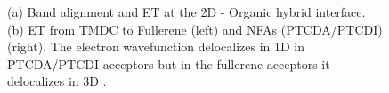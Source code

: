 \documentclass[12pt]{article}
\begin{document}
\begin{figure}[H]
\centering
{} \hspace{20pt}

\caption{(a) Band alignment and ET at the 2D - Organic hybrid interface. (b) ET from TMDC to Fullerene (left) and NFAs (PTCDA/PTCDI) (right). The electron wavefunction delocalizes in 1D in PTCDA/PTCDI acceptors but in the fullerene acceptors it delocalizes in 3D \cite{rijal2020collective}.}\label{fig:charge transfer scheme}
\end{figure}
\end{document}
